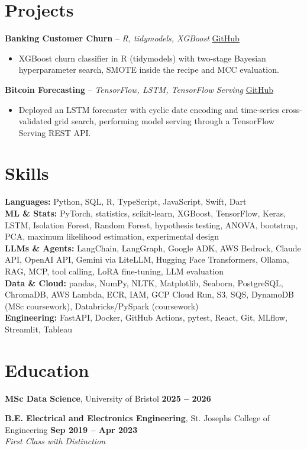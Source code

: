 \documentclass[a4paper,10pt]{article}
\begin{document}
\section{Projects}
\noindent\textbf{Banking Customer Churn} -- \textit{R, tidymodels, XGBoost} \hfill \href{https://github.com/Thiruvel-AP/Banking-Customer-Churn-Prediction}{GitHub}
\begin{itemize}
  \item XGBoost churn classifier in R (tidymodels) with two-stage Bayesian hyperparameter search, SMOTE inside the recipe and MCC evaluation.
\end{itemize}
\noindent\textbf{Bitcoin Forecasting} -- \textit{TensorFlow, LSTM, TensorFlow Serving} \hfill \href{https://github.com/Thiruvel-AP/BitcoinForecasting}{GitHub}
\begin{itemize}
  \item Deployed an LSTM forecaster with cyclic date encoding and time-series cross-validated grid search, performing model serving through a TensorFlow Serving REST API.
\end{itemize}

\section{Skills}
\textbf{Languages:} Python, SQL, R, TypeScript, JavaScript, Swift, Dart\\
\textbf{ML \& Stats:} PyTorch, statistics, scikit-learn, XGBoost, TensorFlow, Keras, LSTM, Isolation Forest, Random Forest, hypothesis testing, ANOVA, bootstrap, PCA, maximum likelihood estimation, experimental design\\
\textbf{LLMs \& Agents:} LangChain, LangGraph, Google ADK, AWS Bedrock, Claude API, OpenAI API, Gemini via LiteLLM, Hugging Face Transformers, Ollama, RAG, MCP, tool calling, LoRA fine-tuning, LLM evaluation\\
\textbf{Data \& Cloud:} pandas, NumPy, NLTK, Matplotlib, Seaborn, PostgreSQL, ChromaDB, AWS Lambda, ECR, IAM, GCP Cloud Run, S3, SQS, DynamoDB (MSc coursework), Databricks/PySpark (coursework)\\
\textbf{Engineering:} FastAPI, Docker, GitHub Actions, pytest, React, Git, MLflow, Streamlit, Tableau

\section{Education}
\textbf{MSc Data Science}, University of Bristol \hfill \textbf{2025 – 2026}\par
\vspace{2pt}
\textbf{B.E. Electrical and Electronics Engineering}, St. Joseph\textquotesingle{}s College of Engineering \hfill \textbf{Sep 2019 – Apr 2023}\\ \textit{First Class with Distinction}\par
\end{document}
